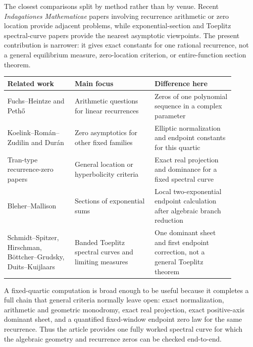 The closest comparisons split by method rather than by venue.  Recent \emph{Indagationes Mathematicae} papers involving recurrence arithmetic or zero location provide adjacent problems, while exponential-section and Toeplitz spectral-curve papers provide the nearest asymptotic viewpoints.  The present contribution is narrower: it gives exact constants for one rational recurrence, not a general equilibrium measure, zero-location criterion, or entire-function section theorem.

\begin{center}
\begin{tabular}{p{0.27\linewidth}p{0.32\linewidth}p{0.32\linewidth}}
\toprule
Related work & Main focus & Difference here\\
\midrule
Fuchs--Heintze and Peth\H{o} \cite{FuchsHeintze2021,Petho2022} & Arithmetic questions for linear recurrences & Zeros of one polynomial sequence in a complex parameter\\
Koelink--Rom\'an--Zudilin and Dur\'an \cite{KoelinkRomanZudilin2025,Duran2025} & Zero asymptotics for other fixed families & Elliptic normalization and endpoint constants for this quartic\\
Tran-type recurrence-zero papers \cite{Tran2014,Tran2015,ForgacsTran2016,ForgacsTran2017,ForgacsTran2020,TranZumba2018,TranZumba2021} & General location or hyperbolicity criteria & Exact real projection and dominance for a fixed spectral curve\\
Bleher--Mallison \cite{BleherMallison2006} & Sections of exponential sums & Local two-exponential endpoint calculation after algebraic branch reduction\\
Schmidt--Spitzer, Hirschman, B\"ottcher--Grudsky, Duits--Kuijlaars \cite{SchmidtSpitzer1960,Hirschman1967,BottcherGrudsky2005,DuitsKuijlaars2012} & Banded Toeplitz spectral curves and limiting measures & One dominant sheet and first endpoint correction, not a general Toeplitz theorem\\
\bottomrule
\end{tabular}
\end{center}

A fixed-quartic computation is broad enough to be useful because it completes a full chain that general criteria normally leave open: exact normalization, arithmetic and geometric monodromy, exact real projection, exact positive-axis dominant sheet, and a quantified fixed-window endpoint zero law for the same recurrence.  Thus the article provides one fully worked spectral curve for which the algebraic geometry and recurrence zeros can be checked end-to-end.
